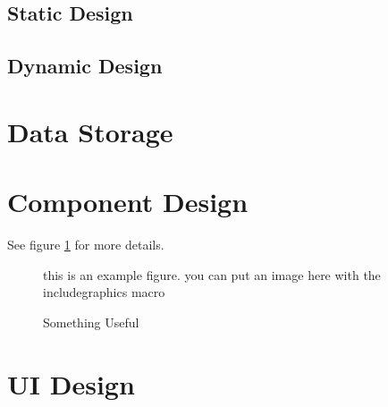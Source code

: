 \documentclass[11pt,letterpaper]{article}
\begin{document}
\subsection{Static Design}

\subsection{Dynamic Design}

\section{Data Storage}


\section{Component Design}

See figure \ref{fig:example} for more details.

\begin{figure}[H]
    \centering
    this is an example figure. you can put an image here with the includegraphics macro
    \caption{Something Useful}
    \label{fig:example}
\end{figure}

\section{UI Design}



\clearpage
\nocite{*}
\printbibliography[title={References}]
\end{document}

